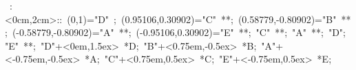 

\hbox{
\xy    <2cm,0cm>:<0cm,2cm>::
       (0,1)="D" ; (0.95106,0.30902)="C" **\dir{-}; 
       (0.58779,-0.80902)="B" **\dir{-}; (-0.58779,-0.80902)="A" **\dir{-}; 
	 (-0.95106,0.30902)="E" **\dir{-}; "C" **\dir{-}; "A" **\dir{-}; "D"; "E" **\dir{-};
       "D"+<0em,1.5ex> *{D};
       "B"+<0.75em,-0.5ex> *{B};
       "A"+<-0.75em,-0.5ex> *{A};
       "C"+<0.75em,0.5ex> *{C};
       "E"+<-0.75em,0.5ex> *{E};
       \endxy}
	   
